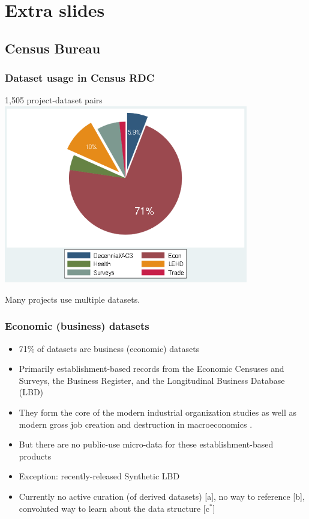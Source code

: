 
\section{Extra slides}
\subsection{Census Bureau}
\begin{frame}[label=Census]
\frametitle{Dataset usage in Census RDC}
\begin{block}{1,505 project-dataset pairs}
\centering
\includegraphics[width=0.8\textwidth]{../pie-chart-rdc-data}
\end{block}
\tiny Many projects use multiple datasets.
\end{frame}

\begin{frame}
\frametitle{Economic (business) datasets}
\begin{itemize}
\item 71\% of datasets are business (economic) datasets
\item Primarily establishment-based records from the
Economic Censuses and Surveys, the Business Register, and the Longitudinal Business Database (LBD)
\item They form the core of the modern
industrial organization studies \cite%
{DunneRobertsSamuelson1989,OlleyPakes1996} as well as modern gross job
creation and destruction in macroeconomics \cite%
{DavisHaltiwangerSchuh,HaltiwangerJarminMiranda2010}.
\item But there are no public-use micro-data for these establishment-based products
\item Exception: recently-released Synthetic LBD \cite%
{AbowdVilhuber2010,KinneyEtAl2011}
\item Currently no active curation (of derived datasets) [a], no way to reference [b], convoluted way to learn about the data structure [c$^*$]
\end{itemize}
\end{frame}

